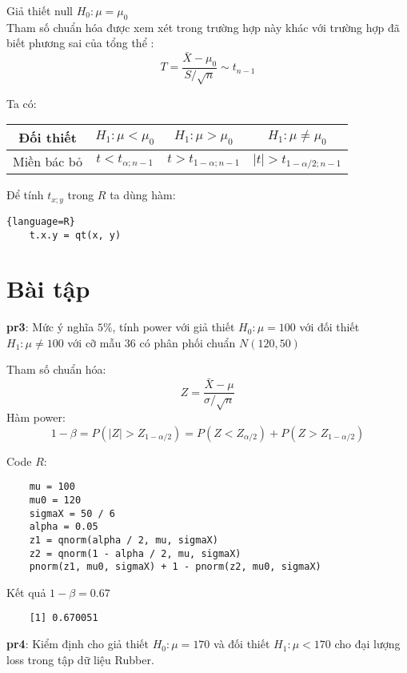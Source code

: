 Giả thiết null $H_0: \mu = \mu_0$ \\
Tham số chuẩn hóa được xem xét trong trường hợp này khác với trường hợp đã biết phương sai của tổng thể
:
\begin{equation}
    T = \frac{\bar{X} - \mu_0}{S/ \sqrt{n}} \sim t_{n - 1}    
\end{equation}


Ta có:

\begin{center}
    \begin{tabular}{| c | c | c | c |}
        \hline
        Đối thiết & $H_1: \mu < \mu_0$ & $H_1: \mu > \mu_0$ & $H_1: \mu \neq \mu_0$ \\
        \hline
        Miền bác bỏ & $t < t_{\alpha; n - 1}$ & $t > t_{1-\alpha; n - 1}$ & $\lvert t \rvert > t_{1 - \alpha / 2; n - 1}$ \\
        \hline
    \end{tabular}
\end{center}

Để tính $t_{x; y}$ trong $R$ ta dùng hàm:

\begin{lstlisting}{language=R}
    t.x.y = qt(x, y)
\end{lstlisting}

\section{Bài tập}
\textbf{pr3}: Mức ý nghĩa $5\%$, tính power với giả thiết $H_0: \mu = 100$ với đối 
thiết $H_1: \mu \neq 100$ với cỡ mẫu 36 có phân phối chuẩn $N(120, 50)$

Tham số chuẩn hóa: 
$$Z = \frac{\bar{X} - \mu}{\sigma / \sqrt{n}}$$
Hàm power: 
$$1 - \beta = P(|Z| > Z_{1 - \alpha / 2}) = P(Z < Z_{\alpha / 2}) + P(Z > Z_{1 - \alpha/2})$$

Code $R$:
\begin{lstlisting}
    mu = 100
    mu0 = 120
    sigmaX = 50 / 6
    alpha = 0.05
    z1 = qnorm(alpha / 2, mu, sigmaX)
    z2 = qnorm(1 - alpha / 2, mu, sigmaX)
    pnorm(z1, mu0, sigmaX) + 1 - pnorm(z2, mu0, sigmaX)
\end{lstlisting}

Kết quả $1- \beta = 0.67$
\begin{lstlisting}
    [1] 0.670051
\end{lstlisting}

\textbf{pr4}: Kiểm định cho giả thiết $H_0: \mu = 170$ và đối thiết $H_1: \mu < 170$
cho đại lượng loss trong tập dữ liệu Rubber.

